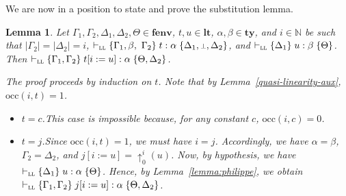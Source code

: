 \documentclass[submission,creativecommons]{eptcs}
\newtheorem{lemma}{Lemma}
\newcommand{\mybox}{\raisebox{3.5pt}{\framebox[7pt]{\rule{0mm}{0.3pt}}}}
\def\qed{\ifmmode\mybox\else{\unskip\nobreak\hfil
\penalty50\hskip1em\null\nobreak\hfil\mybox
\parfillskip=0pt\finalhyphendemerits=0\endgraf}\fi}
\newenvironment{proof}{%

\vspace{.7ex}
\noindent{\it Proof.} \rm}{\qed}
\newcommand{\bt}{{\scriptstyle\bot}}
\newcommand{\sbstt}[3]{#1[#2 := #3]}
\newcommand{\liftt}[3]{{\uparrow}^{#2}_{#3}(#1)}
\newcommand{\tytm}[4]{\{#1\}\;#2:#3\;\{#4\}}
\newcommand{\der}[1]{\vdash_{#1}}
\newcommand{\Sll}{{\textsc{ll}}}
\newcommand{\ltm}{\mathord{\mathbf{lt}}}
\newcommand{\ty}{\mathord{\mathbf{ty}}}
\newcommand{\fenv}{\mathord{\mathbf{fenv}}}
\newcommand{\occ}[2]{\mathord{\mathrm{occ}}(#1,#2)}
\begin{document}
We are now in a position to state and prove the substitution lemma.

\begin{lemma} \label{lemma:sr}
Let $\Gamma_1, \Gamma_2, \Delta_1, \Delta_2, \Theta \in \fenv$, $t, u \in \ltm$, $\alpha, \beta \in \ty$,
and $i \in \mathbb{N}$ be such that $|\Gamma_2| = |\Delta_2| = i$,
$\der{\Sll}\tytm{\Gamma_1, \beta, \Gamma_2}{t}{\alpha}{\Delta_1, \bt, \Delta_2}$, and
$\der{\Sll}\tytm{\Delta_1}{u}{\beta}{\Theta}$.
Then $\der{\Sll}\tytm{\Gamma_1, \Gamma_2}{\sbstt{t}{i}{u}}{\alpha}{\Theta, \Delta_2}$.
\begin{proof}
The proof proceeds by induction on $t$.  Note that by Lemma~\ref{quasi-linearity-aux}, $\occ{i}{t} = 1$.
\begin{itemize}
\item $t = c$.\quad This case is impossible because, for any constant $c$, $\occ{i}{c} = 0$.

\item $t = j$.\quad Since $\occ{i}{t} = 1$, we must have $i=j$.  Accordingly, we have $\alpha = \beta$, $\Gamma_2 = \Delta_2$,
and $\sbstt{j}{i}{u} = \liftt{u}{i}{0}$.  Now, by hypothesis, we have $\der{\Sll}\tytm{\Delta_1}{u}{\alpha}{\Theta}$. Hence,
by Lemma~\ref{lemma:philippe}, we obtain $\der{\Sll}\tytm{\Gamma_1, \Gamma_2}{\sbstt{j}{i}{u}}{\alpha}{\Theta, \Delta_2}$.


\end{itemize}
\end{proof}
\end{lemma}
\end{document}
